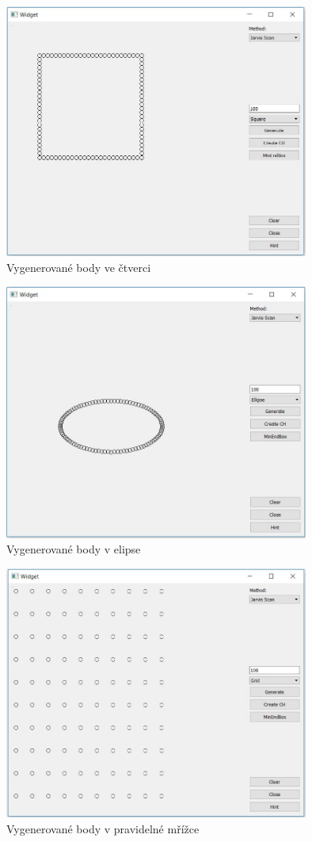 \documentclass[a4paper, 12pt]{article}
\begin{document}
\begin{figure}[h!]
	\centering
	\includegraphics[width=10cm]{square.jpg}
	\caption{Vygenerované body ve čtverci}
\end{figure}

\begin{figure}[h!]
	\centering
	\includegraphics[width=10cm]{ellipse.jpg}
	\caption{Vygenerované body v elipse}
\end{figure}

\begin{figure}[h!]
	\centering
	\includegraphics[width=10cm]{grid.jpg}
	\caption{Vygenerované body v pravidelné mřížce}
\end{figure}
\end{document}
